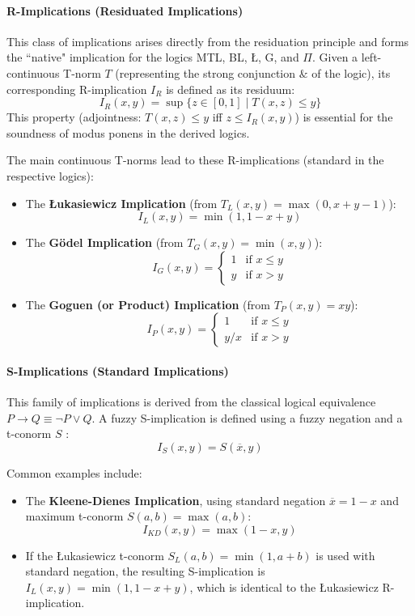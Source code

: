 \paragraph{R-Implications (Residuated Implications)}
This class of implications arises directly from the residuation principle and forms the ``native" implication for the logics MTL, BL, Ł, G, and $\Pi$. Given a left-continuous T-norm $T$ (representing the strong conjunction $\&$ of the logic), its corresponding R-implication $I_R$ is defined as its residuum:
\[
I_R(x, y) = \sup\{z \in [0,1] \mid T(x, z) \le y\}
\]
This property (adjointness: $T(x,z) \le y$ iff $z \le I_R(x, y)$) is essential for the soundness of modus ponens in the derived logics.

\begin{example}
The main continuous T-norms lead to these R-implications (standard in the respective logics):
\begin{itemize}
    \item The \textbf{Łukasiewicz Implication} (from $T_L(x,y) = \max(0, x+y-1)$):
    \[I_L(x,y) = \min(1, 1-x+y)\]
    \item The \textbf{Gödel Implication} (from $T_G(x,y) = \min(x,y)$):
    \[I_G(x,y) = \begin{cases} 1 & \text{if } x \le y \\ y & \text{if } x > y \end{cases}\]
    \item The \textbf{Goguen (or Product) Implication} (from $T_P(x,y) = xy$):
    \[I_P(x,y) = \begin{cases} 1 & \text{if } x \le y \\ y/x & \text{if } x > y \end{cases}\]
\end{itemize}
\end{example}


\paragraph{S-Implications (Standard Implications)}
This family of implications is derived from the classical logical equivalence $P \rightarrow Q \equiv \neg P \lor Q$. A fuzzy S-implication is defined using a fuzzy negation and a t-conorm $S$ \cite[p.59]{FULLER2}:
\[I_S(x,y) = S(\overline{x}, y)\]
\begin{example}[S-Implications]
Common examples include:
\begin{itemize}
    \item The \textbf{Kleene-Dienes Implication}, using standard negation $\overline{x}=1-x$ and maximum t-conorm $S(a,b)=\max(a,b)$:
    \[I_{KD}(x,y) = \max(1-x, y)\]
    \item If the Łukasiewicz t-conorm $S_L(a,b) = \min(1, a+b)$ is used with standard negation, the resulting S-implication is $I_L(x,y) = \min(1, 1-x+y)$, which is identical to the Łukasiewicz R-implication.
\end{itemize}
\end{example}

